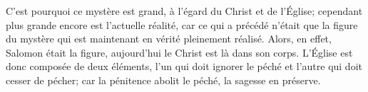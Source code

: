 C’est pourquoi ce mystère est grand, à l’égard du Christ et de l’Église;
	cependant plus grande encore est l’actuelle réalité,
	car ce qui a précédé n’était que la figure du mystère
	qui est maintenant en vérité pleinement réalisé.
Alors, en effet, Salomon était la figure,
	aujourd’hui le Christ est là dans son corps.
L’Église est donc composée de deux éléments,
	l’un qui doit ignorer le péché
	et l’autre qui doit cesser de pécher;
	car la pénitence abolit le péché, la sagesse en préserve.
